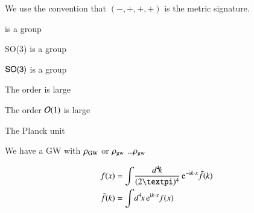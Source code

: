 

We use the convention that $(-,+,+,+)$ is the metric signature.

 is a group 

\textsf{SO(3)} is a group

$\textsf{SO(3)}$ is a group

The order  is large

The order $\mathcal{O}(1)$ is large



The Planck unit 



We have a GW with $\rho_\mathrm{GW}$ or $\rho_\mathrm{gw}$  \dots  $\rho_{\mathrm{gw}}$

\begin{equation}
\begin{split}
    f(x) &= \int \! \frac{d^4\! k}{(2\ppi)^4} \, \eu[-\im k\cdot x] \tilde{f}(k) \\
    \tilde{f}(k) &= \int \! d^4\! x \, \eu[\im k \cdot x] f(x) 
\end{split}
\end{equation}

